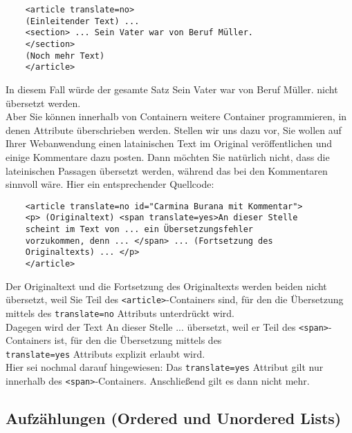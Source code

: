 \begin{verbatim}
	<article translate=no>
	(Einleitender Text) ...
	<section> ... Sein Vater war von Beruf Müller.
	</section>
	(Noch mehr Text)
	</article>
\end{verbatim}

In diesem Fall würde der gesamte Satz \glqq{}Sein Vater war von Beruf Müller.\grqq{} nicht übersetzt werden.\\

Aber Sie können innerhalb von Containern weitere Container programmieren, in denen Attribute überschrieben werden. Stellen wir uns dazu vor, Sie wollen auf Ihrer Webanwendung einen latainischen Text im Original veröffentlichen und einige Kommentare dazu posten. Dann möchten Sie natürlich nicht, dass die lateinischen Passagen übersetzt werden, während das bei den Kommentaren sinnvoll wäre. Hier ein entsprechender Quellcode:

\begin{verbatim}
	<article translate=no id="Carmina Burana mit Kommentar">
	<p> (Originaltext) <span translate=yes>An dieser Stelle 
	scheint im Text von ... ein Übersetzungsfehler 
	vorzukommen, denn ... </span> ... (Fortsetzung des 
	Originaltexts) ... </p>
	</article>
\end{verbatim}

Der \glqq{}Originaltext\grqq{} und die \glqq{}Fortsetzung des Originaltexts\grqq{} werden beiden nicht übersetzt, weil Sie Teil des \verb|<article>|-Containers sind, für den die Übersetzung mittels des \verb|translate=no| Attributs unterdrückt wird.\\

Dagegen wird der Text \glqq{}An dieser Stelle ...\grqq{} übersetzt, weil er Teil des \verb|<span>|-Containers ist, für den die Übersetzung mittels des \\\verb|translate=yes| Attributs explizit erlaubt wird.\\

Hier sei nochmal darauf hingewiesen: Das \verb|translate=yes| Attribut gilt nur innerhalb des \verb|<span>|-Containers. Anschließend gilt es dann nicht mehr. 

\subsection{Aufzählungen (Ordered und Unordered Lists)}

